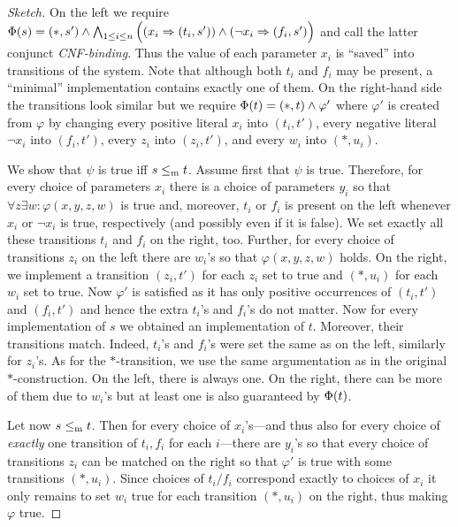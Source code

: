 \begin{proof}[Sketch]
On the left we require $\mathrm{\Phi}(s) = (*,s')\wedge \bigwedge_{1 \le i \le n} 
\Big((x_i \Rightarrow (t_i,s')) \wedge (\neg x_i \Rightarrow (f_i,s')\Big)$ and
call the latter conjunct \emph{CNF-binding}. 
Thus the value of each parameter $x_i$ is ``saved'' into transitions of the system. Note that although both $t_i$ and $f_i$ may be present, a ``minimal'' implementation contains exactly one of them. On the right-hand side 
the transitions look similar but we require
$\mathrm{\Phi}(t) = (*,t)\wedge\varphi'$ 
where $\varphi'$ is created from $\varphi$ by changing
every positive literal $x_i$ into $(t_i,t')$,
every negative literal $\neg x_i$ into $(f_i,t')$,
every $z_i$ into $(z_i,t')$, and
every $w_i$ into $(*,u_i)$.

We show that $\psi$ is true iff $s\le_\mathrm m t$. Assume first that $\psi$ is true. 
Therefore, for every choice of parameters $x_i$ there is a choice of parameters $y_i$ so that $\forall z \exists w : \varphi(x,y,z,w)$ is true and, moreover, $t_i$ or $f_i$ is present on the left whenever $x_i$ or $\neg x_i$ is true, respectively (and possibly even if it is false). We set exactly all these transitions $t_i$ and $f_i$ on the right, too. Further, for every choice of transitions $z_i$ on the left there are $w_i$'s so that $\varphi(x,y,z,w)$ holds. On the right, we implement a transition $(z_i,t')$ for each $z_i$ set to true and $(*,u_i)$ for each $w_i$ set to true. Now $\varphi'$ is satisfied 
as it has only positive occurrences of $(t_i,t')$
and $(f_i,t')$ and hence the extra $t_i$'s and $f_i$'s do not matter. 
Now for every implementation of $s$ we obtained an implementation of $t$. Moreover, their transitions match. Indeed, $t_i$'s and $f_i$'s were set the same as on the left, similarly for $z_i$'s. As for the $*$-transition, we use the same argumentation as in the original $*$-construction. On the left, there is always one. On the right, there can be more of them due to $w_i$'s but at least one is also guaranteed by $\mathrm{\Phi}(t)$.

Let now $s\le_\mathrm m t$. Then for every choice of $x_i$'s---and thus also for every choice of \emph{exactly} one transition of $t_i,f_i$ for each $i$---there are $y_i$'s so that every choice of transitions $z_i$ can be matched on the right so that $\varphi'$ is true with some transitions $(*,u_i)$. Since choices of $t_i/f_i$ correspond exactly to choices of $x_i$ it only remains to set $w_i$ true for each transition $(*,u_i)$ on the right, thus making $\varphi$ true.

\end{proof}


